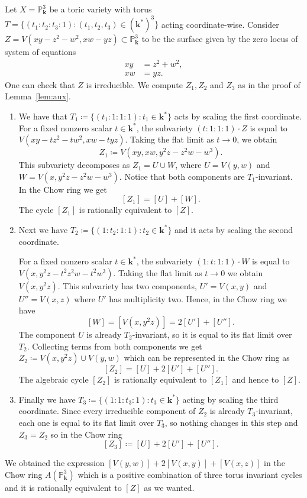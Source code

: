 \documentclass[ALCO,ThmDefs,Unicode,epreuves]{cedram}
\renewcommand{\k}{\mathbf{k}}
\begin{document}
\begin{exam}
	Let $X=\mathbb{P}^3_\k$ be a toric variety with torus $T=\{(t_1:t_2:t_3:1):(t_1,t_2,t_3)\in\left(\k^*\right)^3\}$ acting coordinate-wise. Consider $Z=V(xy-z^2-w^2,xw-yz)\subset \mathbb{P}^3_\k$ to be the surface given by the zero locus of system of equations 
	\begin{align*}
	xy&=z^2+w^2,\\
	xw&=yz.
	\end{align*} 
	One can check that $Z$ is irreducible. We compute $Z_1,Z_2$ and $Z_3$ as in the proof of Lemma~\ref{lem:aux}.
	
	\begin{enumerate}
		
		\item We have that $T_1\coloneqq \{(t_1:1:1:1):t_1\in\k^*\}$ acts by scaling the first coordinate. For a fixed nonzero scalar $t\in\k^*$, the subvariety $(t:1:1:1)\cdot Z$ is equal to $V(xy-tz^2-tw^2, xw-tyz)$. Taking the flat limit as $t\to 0$, we obtain \[Z_1\coloneqq V(xy,xw,y^2z-z^2w-w^3).\] This subvariety decomposes as $Z_1=U\cup W$, where $U=V(y,w)$ and $W=V(x,y^2z-z^2w-w^3)$. Notice that both components are $T_1$-invariant. In the Chow ring we get \[[Z_1]=[U]+[W].\]
		The cycle $[Z_1]$ is rationally equivalent to $[Z]$.
		\item Next we have $T_2\coloneqq \{(1:t_2:1:1):t_2\in\k^*\}$ and it acts by scaling the second coordinate. 
		
		For a fixed nonzero scalar $t\in\k^*$, the subvariety $(1:t:1:1)\cdot W$ is equal to $V(x,y^2z-t^2z^2w-t^2w^3)$. Taking the flat limit as $t\to 0$ we obtain $V(x,y^2z)$. This subvariety has two components, $U'=V(x,y)$ and $U''=V(x,z)$ where $U'$ has multiplicity two. Hence, in the Chow ring we have 
		\[ [W]=[V(x,y^2z)]=2[U']+[U''].\]
		The component $U$ is already $T_2$-invariant, so it is equal to its flat limit over $T_2$. Collecting terms from both components we get $Z_2\coloneqq V(x,y^2z)\cup V(y,w)$ which can be represented in the Chow ring as
		\[[Z_2]=[U]+2[U']+[U''].\]
		The algebraic cycle $[Z_2]$ is rationally equivalent to $[Z_1]$ and hence to $[Z]$.
		
		\item Finally we have $T_3\coloneqq \{(1:1:t_3:1):t_3\in\k^*\}$ acting by scaling the third coordinate. Since every irreducible component of $Z_2$ is already $T_3$-invariant, each one is equal to its flat limit over $T_3$, so nothing changes in this step and $Z_3=Z_2$ so in the Chow ring \[[Z_3]\coloneqq [U]+2[U']+[U''].\]
	\end{enumerate}
	We obtained the expression $[V(y,w)]+2[V(x,y)]+[V(x,z)]$ in the Chow ring $A(\mathbb{P}^3_\k)$ which is a positive combination of three torus invariant cycles and it is rationally equivalent to $[Z]$ as we wanted.
\end{exam}
\end{document}
